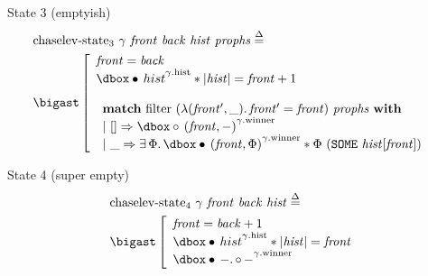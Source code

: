 \begin{frame}{State 3 (emptyish)}
\small
\begin{align*}
		&\mathrm{chaselev \mathhyphen state_3}\ \gamma\ \mathit{front}\ \mathit{back}\ \mathit{hist}\ \mathit{prophs}
		\eqdef
	\\
		&\iBigsep\left[\begin{array}{l}
				\mathit{front} = \mathit{back}
			\\
				\iGhost{\gamma\mathrm{.hist}}{\iAuth{hist}} \iSep
				| \mathit{hist} | = \mathit{front} + 1
			\\\\
				\begin{array}{l}
						\bold{match}\ \mathrm{filter}\ (\lambda (\mathit{front'}, \_) \ldotp \mathit{front'} = \mathit{front})\ \mathit{prophs}\ \bold{with}
					\\
						|\ [] \Rightarrow
						\iGhost{\gamma\mathrm{.winner}}{\iFrag{(\mathit{front}, -)}}
					\\
						|\ \_ \Rightarrow
						\exists \Phi \ldotp
						\iGhost{\gamma\mathrm{.winner}}{\iAuth{(\mathit{front}, \Phi)}} \iSep
						\Phi\ (\exprSome{\mathit{hist} [\mathit{front}]})
				\end{array}
		\end{array}\right.
\end{align*}
\end{frame}


\begin{frame}{State 4 (super empty)}
\begin{align*}
		&\mathrm{chaselev \mathhyphen state_4}\ \gamma\ \mathit{front}\ \mathit{back}\ \mathit{hist}
		\eqdef
	\\
		&\iBigsep\left[\begin{array}{l}
				\mathit{front} = \mathit{back} + 1
			\\
				\iGhost{\gamma\mathrm{.hist}}{\iAuth{hist}} \iSep
				| \mathit{hist} | = \mathit{front}
			\\
				\iGhost{\gamma\mathrm{.winner}}{\iAuth{-} \ldotp \iFrag{-}}
		\end{array}\right.
\end{align*}
\end{frame}